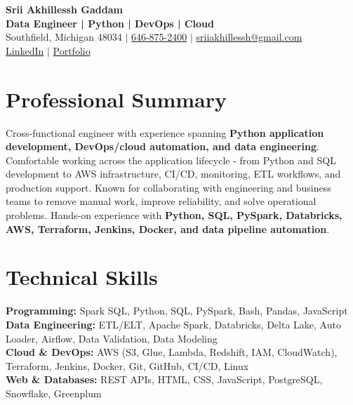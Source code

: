 \documentclass[letterpaper,10pt]{article}
\begin{document}
\fontsize{9.35pt}{10.45pt}\selectfont

\begin{center}
    {\LARGE \textbf{Srii Akhillessh Gaddam}} \\[-1pt]
    \textbf{Data Engineer | Python | DevOps | Cloud} \\[2pt]
    Southfield, Michigan 48034 $|$
    \href{tel:6468752400}{646-875-2400} $|$
    \href{mailto:sriiakhillessh@gmail.com}{sriiakhillessh@gmail.com} \\[1pt]
    \href{https://www.linkedin.com/in/srii-akhiilessh-gaddam-b48668191/}{LinkedIn} $|$
    \href{https://sriiakhillesshg.github.io/portfolio/}{Portfolio}
\end{center}
\vspace{-8pt}

\section{Professional Summary}
\small{Cross-functional engineer with experience spanning \textbf{Python application development, DevOps/cloud automation, and data engineering}. Comfortable working across the application lifecycle - from Python and SQL development to AWS infrastructure, CI/CD, monitoring, ETL workflows, and production support. Known for collaborating with engineering and business teams to remove manual work, improve reliability, and solve operational problems. Hands-on experience with \textbf{Python, SQL, PySpark, Databricks, AWS, Terraform, Jenkins, Docker, and data pipeline automation}.}

\section{Technical Skills}
\small{
\textbf{Programming:} Spark SQL, Python, SQL, PySpark, Bash, Pandas, JavaScript \\
\textbf{Data Engineering:} ETL/ELT, Apache Spark, Databricks, Delta Lake, Auto Loader, Airflow, Data Validation, Data Modeling \\
\textbf{Cloud \& DevOps:} AWS (S3, Glue, Lambda, Redshift, IAM, CloudWatch), Terraform, Jenkins, Docker, Git, GitHub, CI/CD, Linux \\
\textbf{Web \& Databases:} REST APIs, HTML, CSS, JavaScript, PostgreSQL, Snowflake, Greenplum
}

\end{document}
